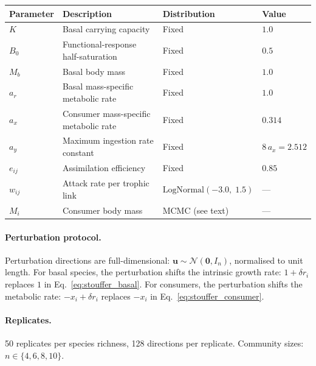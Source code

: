 \documentclass[pdflatex,sn-mathphys-num]{sn-jnl}%
\begin{document}
\begin{center}
\begin{tabular}{llll}
\hline
Parameter & Description & Distribution & Value \\
\hline
$K$  & Basal carrying capacity    & Fixed & $1.0$ \\
$B_0$  & Functional-response half-saturation & Fixed & $0.5$ \\
$M_b$  & Basal body mass      & Fixed & $1.0$ \\
$a_r$  & Basal mass-specific metabolic rate  & Fixed & $1.0$ \\
$a_x$  & Consumer mass-specific metabolic rate & Fixed & $0.314$ \\
$a_y$  & Maximum ingestion rate constant   & Fixed & $8\,a_x = 2.512$ \\
$e_{ij}$ & Assimilation efficiency    & Fixed & $0.85$ \\
$w_{ij}$ & Attack rate per trophic link   & $\mathrm{LogNormal}(-3.0,\;1.5)$ & — \\
$M_i$  & Consumer body mass      & MCMC (see text) & — \\
\hline
\end{tabular}
\label{tab:stouffer_params}
\end{center}

\paragraph{Perturbation protocol.} Perturbation directions are full-dimensional: $\mathbf{u} \sim \mathcal{N}(\mathbf{0},I_n)$, normalised to unit length. For basal species, the perturbation shifts the intrinsic growth rate: $1 + \delta r_i$ replaces $1$ in Eq.~\eqref{eq:stouffer_basal}. For consumers, the perturbation shifts the metabolic rate: $-x_i + \delta r_i$ replaces $-x_i$ in Eq.~\eqref{eq:stouffer_consumer}.

\paragraph{Replicates.} 50 replicates per species richness, 128 directions per replicate. Community sizes: $n \in \{4, 6, 8, 10\}$.


\appendix

\newpage
\end{document}
